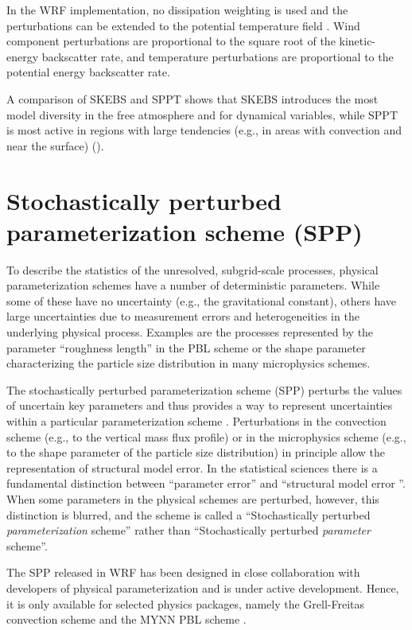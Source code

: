 In the WRF implementation, no dissipation weighting is used and the 
perturbations can be extended to the potential temperature field \citep{Be11}.
Wind component perturbations are proportional to the square
root of the kinetic-energy backscatter rate, and temperature
perturbations are proportional to the potential energy backscatter rate.

A comparison of SKEBS and SPPT shows that SKEBS introduces the most model 
diversity in the free atmosphere and for dynamical variables, 
while SPPT is most active in regions with large tendencies (e.g., in areas with convection 
and near the surface) (\citep{Be15}).
\section {Stochastically perturbed parameterization scheme (SPP)}
To describe the statistics of the unresolved, subgrid-scale processes, 
physical parameterization schemes have a number of deterministic parameters.
While some of these have no uncertainty (e.g., the gravitational constant), 
others have large uncertainties due to 
measurement errors and heterogeneities in the underlying physical process.
Examples are the processes represented by the parameter ``roughness length'' in the PBL 
scheme or the shape parameter characterizing the particle size distribution in 
many microphysics schemes.  

The stochastically perturbed parameterization scheme (SPP)
perturbs the values of uncertain key parameters and thus provides 
a way to represent uncertainties within a particular parameterization scheme
\citep{Bo08,Ha11a}.
Perturbations in the convection scheme (e.g., to the vertical mass flux 
profile) or in the microphysics scheme (e.g., to the shape parameter of 
the particle size distribution) in principle allow the representation of
structural model error.  In the statistical sciences there is a fundamental 
distinction between ``parameter error'' and 
``structural model error ''. When some parameters in the physical schemes 
are perturbed, however, this distinction is blurred, and the scheme is 
called a ``Stochastically perturbed {\it parameterization} scheme''
rather than ``Stochastically perturbed {\it parameter} scheme''. 

The SPP released in WRF has been designed in close collaboration with 
developers of physical parameterization and is under active development. 
Hence, it is only
available for selected physics packages, namely the Grell-Freitas convection
scheme and the MYNN PBL scheme \citep{jankov2017performance}.

